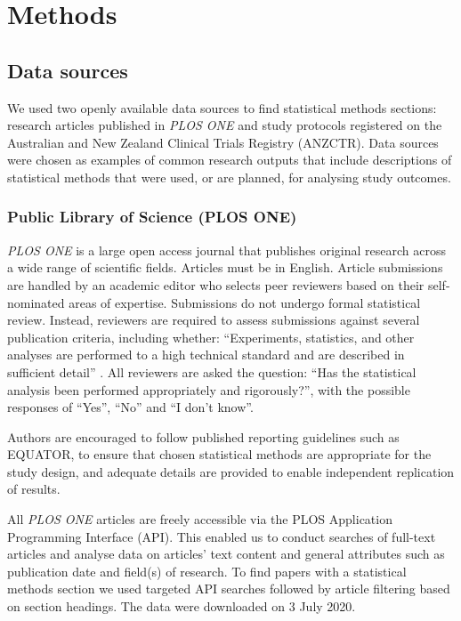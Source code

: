 \documentclass[12pt]{article}
\begin{document}
\hypertarget{methods}{%
\section{Methods}\label{methods}}

\subsection{Data sources}

We used two openly available data sources to find statistical methods
sections: research articles published in \emph{PLOS ONE} and study
protocols registered on the Australian and New Zealand Clinical Trials
Registry (ANZCTR). Data sources were chosen as examples of common
research outputs that include descriptions of statistical methods that
were used, or are planned, for analysing study outcomes.

\subsubsection{Public Library of Science (PLOS ONE)}
\label{sec:methodsPLOS}

\emph{PLOS ONE} is a large open access journal that publishes original
research across a wide range of scientific fields. Articles must be in
English. Article submissions are handled by an academic editor who
selects peer reviewers based on their self-nominated areas of expertise.
Submissions do not undergo formal statistical review. Instead, reviewers
are required to assess submissions against several publication criteria,
including whether: ``Experiments, statistics, and other analyses are
performed to a high technical standard and are described in sufficient
detail'' \citep{PLOS}. All reviewers are asked the question: ``Has the
statistical analysis been performed appropriately and rigorously?'',
with the possible responses of ``Yes'', ``No'' and ``I don't know''.

Authors are encouraged to follow published reporting guidelines such as
EQUATOR, to ensure that chosen statistical methods are appropriate for
the study design, and adequate details are provided to enable
independent replication of results.

All \emph{PLOS ONE} articles are freely accessible via the PLOS
Application Programming Interface (API). This enabled us to conduct
searches of full-text articles and analyse data on articles' text
content and general attributes such as publication date and field(s) of
research. To find papers with a statistical methods section we used
targeted API searches followed by article filtering based on section
headings. The data were downloaded on 3 July 2020.
\end{document}

